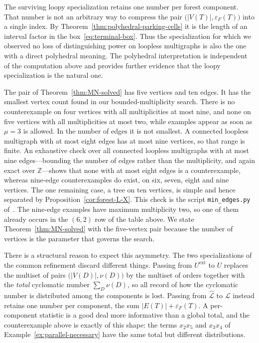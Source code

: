 \documentclass[11pt]{article}
\theoremstyle{plain}
\theoremstyle{definition}
\renewcommand{\mathcal}{\mathscr}
\newcommand{\LL}{\mathcal{L}}    %
\newcommand{\eps}{\varepsilon}
\newcommand{\ext}{\mathrm{ext}}
\newcommand{\ZZ}{\mathbb Z}
\numberwithin{equation}{section}
\begin{document}
The surviving loopy specialization retains one number per forest component.
That number is not an arbitrary way to compress the pair
$\bigl(|V(T)|,\eps_F(T)\bigr)$ into a single index.
By Theorem~\ref{thm:polyhedral-parking-cells} it is the length of an interval
factor in the box~\eqref{eq:terminal-box}.  Thus the specialization for which
we observed no loss of distinguishing power on loopless multigraphs is also
the one with a direct polyhedral meaning.  The polyhedral interpretation is
independent of the computation above and
provides further evidence that the loopy specialization is the natural one.


The pair of Theorem~\ref{thm:MN-solved} has five vertices and ten edges.
It has the smallest vertex count found in our
bounded-multiplicity search.
There is no counterexample on four vertices with all multiplicities at most
nine, and none on five vertices with all multiplicities at most two, while
examples appear as soon as $\mu=3$ is allowed.  In the number of edges it is
not smallest.  A connected loopless multigraph with at most eight edges has at
most nine vertices, so that range is finite.  An exhaustive check over all
connected loopless multigraphs with at most nine edges---bounding the number of
edges rather than the multiplicity, and again exact over $\ZZ$---shows
that none with at most eight edges is a counterexample, whereas nine-edge
counterexamples do exist, on six, seven, eight and nine vertices.  The one
remaining case, a tree on ten vertices, is simple and hence separated by
Proposition~\ref{cor:forest-L-X}.  This check is the script \texttt{min\_edges.py}
of~\cite{code}.  The nine-edge examples have maximum
multiplicity two, so one of them already occurs in the $(6,2)$ row of the table
above.  We state Theorem~\ref{thm:MN-solved} with the five-vertex pair because
the number of vertices is the parameter that governs the search.

There is a structural reason to expect this asymmetry.  The two specializations of
the common refinement discard different things.
Passing from $U^{\ext}$ to $U$ replaces the multiset of pairs $\bigl(|V(D)|,\nu(D)\bigr)$
by the multiset of orders together with the \emph{total} cyclomatic number $\sum_D\nu(D)$,
so all record of how the cyclomatic number is distributed among the components is lost.
Passing from $\widehat{\LL}$ to $\LL$ instead retains one number per component,
the sum $|E(T)|+\eps_F(T)$.
A per-component statistic is a good deal more informative than a global total,
and the counterexample above is exactly of this shape: the terms $x_2x_5$ and $x_3x_4$ of
Example~\ref{ex:parallel-necessary} have the same total but different distributions.
\end{document}
